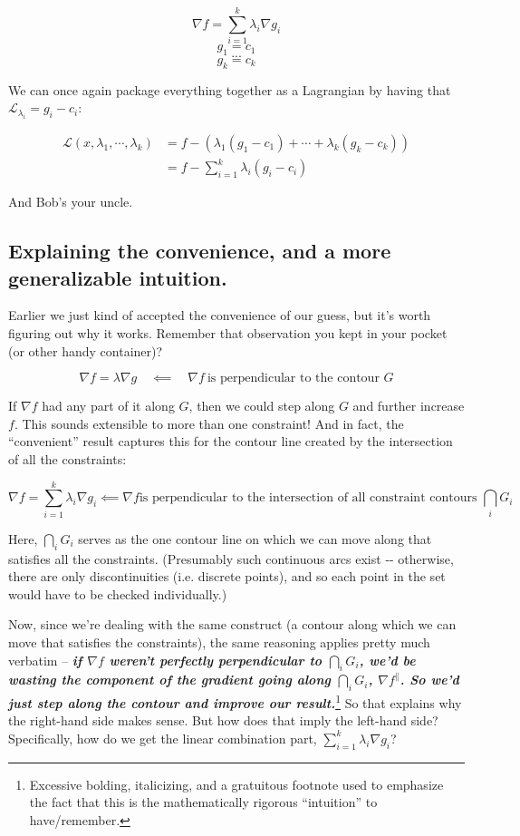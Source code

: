 \documentclass[letterpaper,12pt]{report}
\begin{document}
\[ \nabla f = \sum_{i=1}^k \lambda _i \nabla g_i \] \[ g_1 = c_1 \]
\[ ... \] \[ g_k = c_k \]

We can once again package everything together as a Lagrangian by having
that \(\mathcal{L}_{\lambda _i} = g_i - c_i\):

\[\begin{split} \mathcal{L}(x, \lambda _1, \cdots, \lambda _k) &= 
                                            f - (\lambda _1 (g_1 - c_1) + \cdots + \lambda _k (g_k - c_k) ) \\
                     &= f - \sum_{i=1}^k \lambda _i (g_i - c_i) \end{split}\]

And Bob's your uncle.

\subsection{Explaining the convenience, and a more generalizable intuition.}\label{explaining-the-convenience}

Earlier we just kind of accepted the convenience of our guess, but it's
worth figuring out why it works. Remember that observation you kept in
your pocket (or other handy container)?

\[\nabla f = \lambda \nabla g \quad \impliedby \quad \nabla f \ \text{is perpendicular to the contour } G \]

If \(\nabla f\) had any part of it along \(G\), then we could step along
\(G\) and further increase \(f\). This sounds extensible to more than
one constraint! And in fact, the ``convenient'' result captures this for
the contour line created by the intersection of all the constraints:

\[
  \nabla f = \sum_{i=1}^k \lambda _i \nabla g_i  \impliedby
  \nabla f \text{is perpendicular to the intersection
  of all constraint contours } \bigcap _i G_i 
\]

Here, \(\bigcap _i G_i\) serves as the one contour line on which we can
move along that satisfies all the constraints. (Presumably such
continuous arcs exist -\/- otherwise, there are only discontinuities
(i.e. discrete points), and so each point in the set would have to be
checked individually.)

Now, since we're dealing with the same construct (a contour along which
we can move that satisfies the constraints), the same reasoning applies
pretty much verbatim -- \emph{\textbf{if \(\nabla f\) weren't perfectly
perpendicular to \(\bigcap _i G_i\), we'd be wasting the component of
the gradient going along \(\bigcap _i G_i\), \(\nabla f ^{\parallel}\).
So we'd just step along the contour and improve our result.}}\footnote{
  Excessive bolding, italicizing, and a gratuitous footnote 
  used to emphasize the fact that this is the
  mathematically rigorous ``intuition'' to have/remember.
}
So that explains why the right-hand side makes sense. But how does that
imply the left-hand side? Specifically, how do we get the linear
combination part, \( \sum_{i=1}^k \lambda _i \nabla g_i \)?
\end{document}
